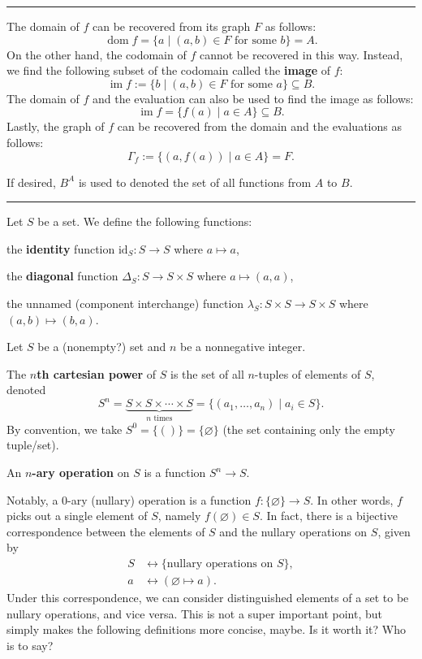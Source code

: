 \documentclass[12pt]{article}
\newcommand{\keyword}[1]{\textbf{#1}}
\newcommand{\sepline}{\rule{\textwidth}{0.4pt}}
\theoremstyle{definition}
\renewcommand{\emptyset}{\varnothing}
\newcommand{\<}{\left\langle}
\renewcommand{\>}{\right\rangle}
\newcommand{\seq}{\subseteq}
\newcommand{\id}{\mathrm{id}}
\DeclareMathOperator{\dom}{dom}
\DeclareMathOperator{\im}{im}
\renewcommand{\_}[1]{{_{#1}}}
\begin{document}
\sepline

The domain of $f$ can be recovered from its graph $F$ as follows:
\[
    \dom f = \{a \mid (a, b) \in F \text{ for some } b\} = A.
\]
On the other hand, the codomain of $f$ cannot be recovered in this way.
Instead, we find the following subset of the codomain called the \keyword{image} of $f$:
\[
    \im f := \{b \mid (a, b) \in F \text{ for some } a\} \seq B.
\]
The domain of $f$ and the evaluation can also be used to find the image as follows:
\[
    \im f = \{f(a) \mid a \in A\} \seq B.
\]
Lastly, the graph of $f$ can be recovered from the domain and the evaluations as follows:
\[
    \Gamma_f := \{(a, f(a)) \mid a \in A\} = F.
\]



If desired, $B^A$ is used to denoted the set of all functions from $A$ to $B$.



\sepline

Let $S$ be a set.
We define the following functions:

the \keyword{identity} function $\id_S : S \to S$ where $a \mapsto a$,

the \keyword{diagonal} function $\Delta_S : S \to S \times S$ where $a \mapsto (a, a)$,

the unnamed (component interchange) function $\lambda_S : S \times S \to S \times S$ where $(a, b) \mapsto (b, a)$.




\newpage

Let $S$ be a (nonempty?) set and $n$ be a nonnegative integer.

The \keyword{$n$th cartesian power} of $S$ is the set of all $n$-tuples of elements of $S$, denoted
\[
    S^n
        = \underbrace{S \times S \times \cdots \times S}_{n \text{ times}}
        = \{(a_1, \dots, a_n) \mid a_i \in S\}.
\]
By convention, we take $S^0 = \{()\} = \{\emptyset\}$ (the set containing only the empty tuple/set).

An \keyword{$n$-ary operation} on $S$ is a function $S^{n} \to S$.

Notably, a $0$-ary (nullary) operation is a function $f : \{\emptyset\} \to S$.
In other words, $f$ picks out a single element of $S$, namely $f(\emptyset) \in S$.
In fact, there is a bijective correspondence between the elements of $S$ and the nullary operations on $S$, given by
\begin{align*}
    S &\longleftrightarrow \{\text{nullary operations on } S\}, \\
    a &\longleftrightarrow (\emptyset \mapsto a).
\end{align*}
Under this correspondence, we can consider distinguished elements of a set to be nullary operations, and vice versa.
This is not a super important point, but simply makes the following definitions more concise, maybe.
Is it worth it? Who is to say?
\end{document}
